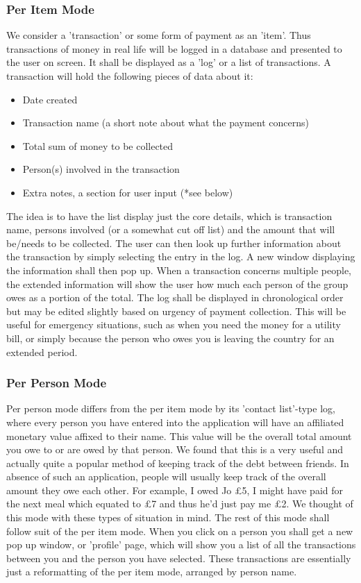 \documentclass[a4paper,9t]{article}
\begin{document}
\subsubsection*{Per Item Mode}
We consider a 'transaction' or some form of payment as an 'item'. Thus transactions of money in real life will be logged in a database and presented to the user on screen. It shall be displayed as a 'log' or a list of transactions. 
A transaction will hold the following pieces of data about it:
\begin{itemize}
\item{Date created}
\item{Transaction name (a short note about what the payment concerns)}
\item{Total sum of money to be collected}
\item{Person(s) involved in the transaction}
\item{Extra notes, a section for user input (*see below)}
\end{itemize}
The idea is to have the list display just the core details, which is transaction name, persons involved (or a somewhat cut off list) and the amount that will be/needs to be collected. The user can then look up further information about the transaction by simply selecting the entry in the log. A new window displaying the information shall then pop up. When a transaction concerns multiple people, the extended information will show the user how much each person of the group owes as a portion of the total.
The log shall be displayed in chronological order but may be edited slightly based on urgency of payment collection. This will be useful for emergency situations, such as when you need the money for a utility bill, or simply because the person who owes you is leaving the country for an extended period.

\subsubsection*{Per Person Mode}
Per person mode differs from the per item mode by its 'contact list'-type log, where every person you have entered into the application will have an affiliated monetary value affixed to their name. This value will be the overall total amount you owe to or are owed by that person. 
We found that this is a very useful and actually quite a popular method of keeping track of the debt between friends. In absence of such an application, people will usually keep track of the overall amount they owe each other. For example, I owed Jo £5, I might have paid for the next meal which equated to £7 and thus he'd just pay me £2. We thought of this mode with these types of situation in mind.
The rest of this mode shall follow suit of the per item mode. When you click on a person you shall get a new pop up window, or 'profile' page, which will show you a list of all the transactions between you and the person you have selected. These transactions are essentially just a reformatting of the per item mode, arranged by person name.
\end{document}
